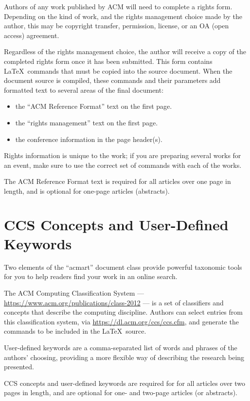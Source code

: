 \documentclass[acmlarge]{acmart}
\begin{document}
	Authors of any work published by ACM will need to complete a rights
	form. Depending on the kind of work, and the rights management choice
	made by the author, this may be copyright transfer, permission,
	license, or an OA (open access) agreement.
	
	Regardless of the rights management choice, the author will receive a
	copy of the completed rights form once it has been submitted. This
	form contains \LaTeX\ commands that must be copied into the source
	document. When the document source is compiled, these commands and
	their parameters add formatted text to several areas of the final
	document:
	\begin{itemize}
		\item the ``ACM Reference Format'' text on the first page.
		\item the ``rights management'' text on the first page.
		\item the conference information in the page header(s).
	\end{itemize}
	
	Rights information is unique to the work; if you are preparing several
	works for an event, make sure to use the correct set of commands with
	each of the works.
	
	The ACM Reference Format text is required for all articles over one
	page in length, and is optional for one-page articles (abstracts).
	
	\section{CCS Concepts and User-Defined Keywords}
	
	Two elements of the ``acmart'' document class provide powerful
	taxonomic tools for you to help readers find your work in an online
	search.
	
	The ACM Computing Classification System ---
	\url{https://www.acm.org/publications/class-2012} --- is a set of
	classifiers and concepts that describe the computing
	discipline. Authors can select entries from this classification
	system, via \url{https://dl.acm.org/ccs/ccs.cfm}, and generate the
	commands to be included in the \LaTeX\ source.
	
	User-defined keywords are a comma-separated list of words and phrases
	of the authors' choosing, providing a more flexible way of describing
	the research being presented.
	
	CCS concepts and user-defined keywords are required for for all
	articles over two pages in length, and are optional for one- and
	two-page articles (or abstracts).
	
\end{document}
